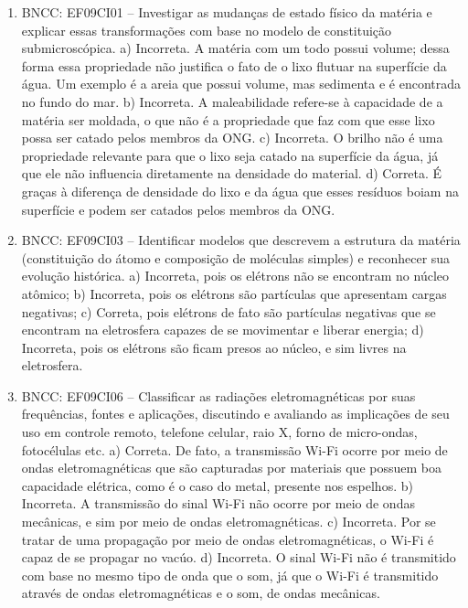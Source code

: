 \begin{enumerate}
\item
BNCC: EF09CI01 -- Investigar as mudanças de estado físico da matéria e explicar essas transformações com base no modelo de constituição submicroscópica.
a) Incorreta. A matéria com um todo possui volume; dessa forma essa propriedade não justifica o fato de o lixo flutuar na superfície da água. Um exemplo é a areia que possui volume, mas sedimenta e é encontrada no fundo do mar.
b) Incorreta. A maleabilidade refere-se à capacidade de a matéria ser
  moldada, o que não é a propriedade que faz com que esse lixo possa ser catado pelos membros da ONG.
c) Incorreta. O brilho não é uma propriedade relevante para que o lixo seja catado na superfície da água, já que ele não influencia diretamente na densidade do material.
d) Correta. É graças à diferença de densidade do lixo e da água que esses resíduos boiam na superfície e podem ser catados pelos membros
  da ONG.

\item
BNCC: EF09CI03 -- Identificar modelos que descrevem a estrutura da matéria (constituição do átomo e composição de moléculas
simples) e reconhecer sua evolução histórica.
a) Incorreta, pois os elétrons não se encontram no núcleo atômico;
b) Incorreta, pois os elétrons são partículas que apresentam cargas
  negativas;
c) Correta, pois elétrons de fato são partículas negativas que se
  encontram na eletrosfera capazes de se movimentar e liberar energia;
d) Incorreta, pois os elétrons são ficam presos ao núcleo, e sim livres
  na eletrosfera.

\item
BNCC: EF09CI06 -- Classificar as radiações
eletromagnéticas por suas frequências, fontes e aplicações, discutindo e
avaliando as implicações de seu uso em controle remoto, telefone celular, raio X, forno de micro-ondas, fotocélulas etc.
a) Correta. De fato, a transmissão Wi-Fi ocorre por meio de ondas eletromagnéticas que são capturadas por materiais que possuem boa capacidade elétrica, como é o caso do metal, presente nos espelhos.
b) Incorreta. A transmissão do sinal Wi-Fi não ocorre por meio de ondas mecânicas, e sim por meio de ondas eletromagnéticas.
c) Incorreta. Por se tratar de uma propagação por meio de ondas eletromagnéticas, o Wi-Fi é capaz de se propagar no vacúo.
d) Incorreta. O sinal Wi-Fi não é transmitido com base no mesmo tipo de onda que o som, já que o Wi-Fi é transmitido através de ondas eletromagnéticas e o som, de ondas mecânicas.
\end{enumerate}

